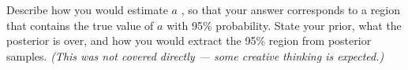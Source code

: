 \subquestion[6]{}
Describe how you would estimate $a$ , so that your answer corresponds to a region that contains the true value of $a$ with 95\% probability. State your prior, what the posterior is over, and how you would extract the 95\% region from posterior samples. \emph{(This was not covered directly --- some creative thinking is expected.)}

\ifanswerspace
\begin{verbatim}










\end{verbatim}
\vfillstretch
\fi
